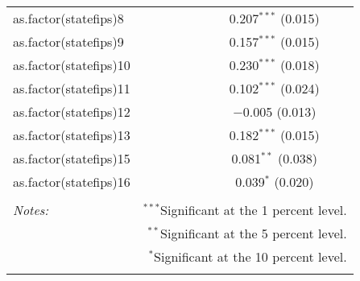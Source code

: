 \documentclass{article}
\begin{document}
\begin{table}[!htbp]
\begin{tabular}{@{\extracolsep{5pt}}lcccc}
  as.factor(statefips)8 &  &  &  & 0.207$^{***}$ (0.015) \\ 
  as.factor(statefips)9 &  &  &  & 0.157$^{***}$ (0.015) \\ 
  as.factor(statefips)10 &  &  &  & 0.230$^{***}$ (0.018) \\ 
  as.factor(statefips)11 &  &  &  & 0.102$^{***}$ (0.024) \\ 
  as.factor(statefips)12 &  &  &  & $-$0.005 (0.013) \\ 
  as.factor(statefips)13 &  &  &  & 0.182$^{***}$ (0.015) \\ 
  as.factor(statefips)15 &  &  &  & 0.081$^{**}$ (0.038) \\ 
  as.factor(statefips)16 &  &  &  & 0.039$^{*}$ (0.020) \\ 
 \hline 
\hline \\[-1.8ex] 
\textit{Notes:} & \multicolumn{4}{r}{$^{***}$Significant at the 1 percent level.} \\ 
 & \multicolumn{4}{r}{$^{**}$Significant at the 5 percent level.} \\ 
 & \multicolumn{4}{r}{$^{*}$Significant at the 10 percent level.} \\ 
\normalsize 
\end{tabular} 
\end{table} 
\end{document}
